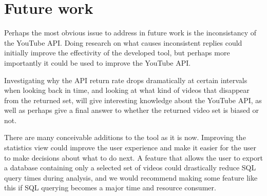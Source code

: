 \section{Future work}
Perhaps the most obvious issue to address in future work is the inconsistancy
of the YouTube API. Doing research on what causes inconsistent replies could
initially improve the effectivity of the developed tool, but perhaps more 
importantly it could be used to improve the YouTube API. 

Investigating why the API return rate drops dramatically at certain intervals
when looking back in time, and looking at what kind of videos that disappear
from the returned set, will give interesting knowledge about the YouTube API,
as well as perhaps give a final answer to whether the returned video set is
biased or not.

There are many conceivable additions to the tool as it is now. Improving the
statistics view could improve the user experience and make it easier for the
user to make decisions about what to do next. A feature that allows the user to
export a database containing only a selected set of videos could drastically
reduce SQL query times during analysis, and we would recommend making some
feature like this if SQL querying becomes a major time and resource consumer.

